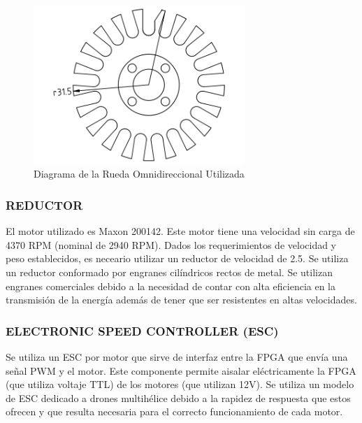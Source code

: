 \documentclass[twocolumn,10pt]{amrob}
\begin{document}
\begin{figure}[t]
  \centering
    \includegraphics[width=8cm]{rueda.png}
  \caption{Diagrama de la Rueda Omnidireccional Utilizada}
  \label{fig:ruedaOmni}
\end{figure}
\subsubsection*{REDUCTOR}
El motor utilizado es Maxon 200142. Este motor tiene una velocidad sin carga de 4370 RPM (nominal de 2940 RPM). Dados los requerimientos de velocidad y peso establecidos, es neceario utilizar un reductor de velocidad de 2.5. Se utiliza un reductor conformado por engranes cilíndricos rectos de metal. Se utilizan engranes comerciales debido a la necesidad de contar con alta eficiencia en la transmisión de la energía además de tener que ser resistentes en altas velocidades. \par
\subsubsection*{ELECTRONIC SPEED CONTROLLER (ESC)}
Se utiliza un ESC por motor que sirve de interfaz entre la FPGA que envía una señal PWM y el motor. Este componente permite aisalar eléctricamente la FPGA (que utiliza voltaje TTL) de los motores (que utilizan 12V). Se utiliza un modelo de ESC dedicado a drones multihélice debido a la rapidez de respuesta que estos ofrecen y que resulta necesaria para el correcto funcionamiento de cada motor.\par 
\end{document}
